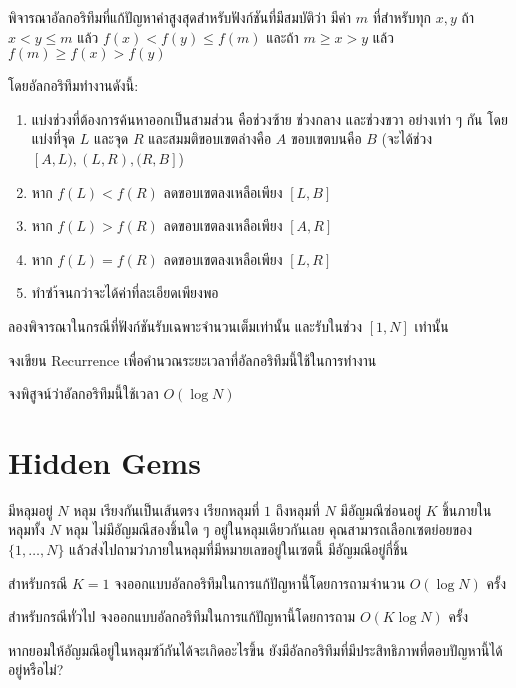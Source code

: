 พิจารณาอัลกอริทึมที่แก้ปัญหาค่าสูงสุดสำหรับฟังก์ชันที่มีสมบัติว่า มีค่า $m$ ที่สำหรับทุก $x, y$ ถ้า $x < y \leq m$ แล้ว $f(x) < f(y) \leq f(m)$ และถ้า $m \geq x > y$ แล้ว $f(m) \geq f(x) > f(y)$

โดยอัลกอริทึมทำงานดังนี้:
\begin{enumerate}[nosep]
    \item แบ่งช่วงที่ต้องการค้นหาออกเป็นสามส่วน คือช่วงซ้าย ช่วงกลาง และช่วงขวา อย่างเท่า ๆ กัน โดยแบ่งที่จุด $L$ และจุด $R$ และสมมติขอบเขตล่างคือ $A$ ขอบเขตบนคือ $B$ (จะได้ช่วง $[A, L), (L, R), (R, B]$)
    \item หาก $f(L) < f(R)$ ลดขอบเขตลงเหลือเพียง $[L, B]$
    \item หาก $f(L) > f(R)$ ลดขอบเขตลงเหลือเพียง $[A, R]$
    \item หาก $f(L) = f(R)$ ลดขอบเขตลงเหลือเพียง $[L, R]$
    \item ทำซำ้จนกว่าจะได้ค่าที่ละเอียดเพียงพอ
\end{enumerate}

ลองพิจารณาในกรณีที่ฟังก์ชันรับเฉพาะจำนวนเต็มเท่านั้น และรับในช่วง $[1, N]$ เท่านั้น

\begin{exercise}
จงเขียน Recurrence เพื่อคำนวณระยะเวลาที่อัลกอริทึมนี้ใช้ในการทำงาน
\end{exercise}

\begin{exercise}
จงพิสูจน์ว่าอัลกอริทึมนี้ใช้เวลา $O(\log N)$
\end{exercise}

\section{Hidden Gems}

มีหลุมอยู่ $N$ หลุม เรียงกันเป็นเส้นตรง เรียกหลุมที่ $1$ ถึงหลุมที่ $N$ มีอัญมณีซ่อนอยู่ $K$ ชิ้นภายในหลุมทั้ง $N$ หลุม ไม่มีอัญมณีสองชิ้นใด ๆ อยู่ในหลุมเดียวกันเลย คุณสามารถเลือกเซตย่อยของ $\{1, \dots, N\}$ แล้วส่งไปถามว่าภายในหลุมที่มีหมายเลขอยู่ในเซตนี้ มีอัญมณีอยู่กี่ชิ้น

\begin{exercise}
สำหรับกรณี $K = 1$ จงออกแบบอัลกอริทึมในการแก้ปัญหานี้โดยการถามจำนวน $O(\log N)$ ครั้ง
\end{exercise}

\begin{exercise}
สำหรับกรณีทั่วไป จงออกแบบอัลกอริทึมในการแก้ปัญหานี้โดยการถาม $O(K \log N)$ ครั้ง
\end{exercise}

\begin{bonus}
หากยอมให้อัญมณีอยู่ในหลุมซำ้กันได้จะเกิดอะไรขึ้น ยังมีอัลกอริทึมที่มีประสิทธิภาพที่ตอบปัญหานี้ได้อยู่หรือไม่?
\end{bonus}